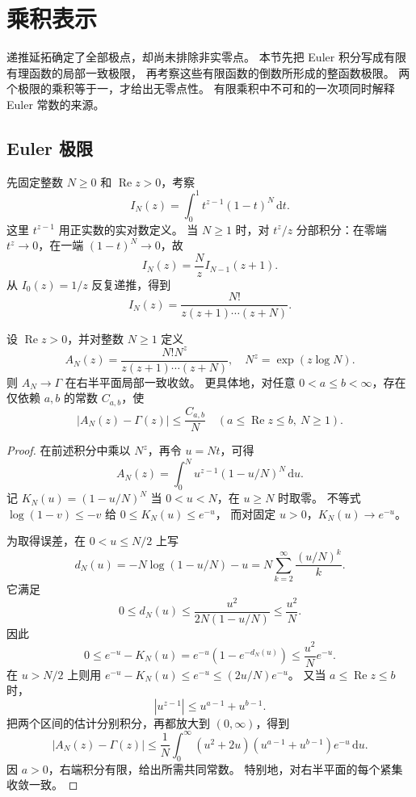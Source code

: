 \section{乘积表示}
\label{b3:sec:2103}

递推延拓确定了全部极点，却尚未排除非实零点。
本节先把 Euler 积分写成有限有理函数的局部一致极限，
再考察这些有限函数的倒数所形成的整函数极限。
两个极限的乘积等于一，才给出无零点性。
有限乘积中不可和的一次项同时解释 Euler 常数的来源。

\subsection{Euler 极限}
\label{b3:subsec:210301}

先固定整数 \(N\ge0\) 和 \(\operatorname{Re}z>0\)，考察
\[
 I_N(z)=\int_0^1t^{z-1}(1-t)^N\,\mathrm dt.
\]
这里 \(t^{z-1}\) 用正实数的实对数定义。
当 \(N\ge1\) 时，对 \(t^z/z\) 分部积分：在零端
\(t^z\to0\)，在一端 \((1-t)^N\to0\)，故
\[
 I_N(z)=\frac Nz I_{N-1}(z+1).
\]
从 \(I_0(z)=1/z\) 反复递推，得到
\[
 I_N(z)=\frac{N!}{z(z+1)\cdots(z+N)}.
\]


\begin{lemma}[Euler 极限]\label{b3:lem:21-euler-limit}
设 \(\operatorname{Re}z>0\)，并对整数 \(N\ge1\) 定义
\[
 A_N(z)=\frac{N!N^z}{z(z+1)\cdots(z+N)},\quad
 N^z=\exp(z\log N).
\]
则 \(A_N\to\Gamma\) 在右半平面局部一致收敛。
更具体地，对任意 \(0<a\le b<\infty\)，存在仅依赖 \(a,b\) 的常数
\(C_{a,b}\)，使
\[
 |A_N(z)-\Gamma(z)|\le\frac{C_{a,b}}N
 \quad(a\le\operatorname{Re}z\le b,\ N\ge1).
\]
\end{lemma}
\begin{proof}
在前述积分中乘以 \(N^z\)，再令 \(u=Nt\)，可得
\[
 A_N(z)=\int_0^N u^{z-1}(1-u/N)^N\,\mathrm du.
\]
记 \(K_N(u)=(1-u/N)^N\) 当 \(0<u<N\)，在 \(u\ge N\) 时取零。
不等式 \(\log(1-v)\le-v\) 给 \(0\le K_N(u)\le e^{-u}\)，
而对固定 \(u>0\)，\(K_N(u)\to e^{-u}\)。

为取得误差，在 \(0<u\le N/2\) 上写
\[
 d_N(u)=-N\log(1-u/N)-u
       =N\sum_{k=2}^\infty\frac{(u/N)^k}{k}.
\]
它满足
\[
 0\le d_N(u)\le\frac{u^2}{2N(1-u/N)}\le\frac{u^2}{N}.
\]
因此
\[
 0\le e^{-u}-K_N(u)
 =e^{-u}(1-e^{-d_N(u)})\le\frac{u^2}{N}e^{-u}.
\]
在 \(u>N/2\) 上则用
\(e^{-u}-K_N(u)\le e^{-u}\le(2u/N)e^{-u}\)。
又当 \(a\le\operatorname{Re}z\le b\) 时，
\[
 |u^{z-1}|\le u^{a-1}+u^{b-1}.
\]
把两个区间的估计分别积分，再都放大到 \((0,\infty)\)，得到
\[
 |A_N(z)-\Gamma(z)|
 \le\frac1N\int_0^\infty
 (u^2+2u)(u^{a-1}+u^{b-1})e^{-u}\,\mathrm du.
\]
因 \(a>0\)，右端积分有限，给出所需共同常数。
特别地，对右半平面的每个紧集收敛一致。
\end{proof}

